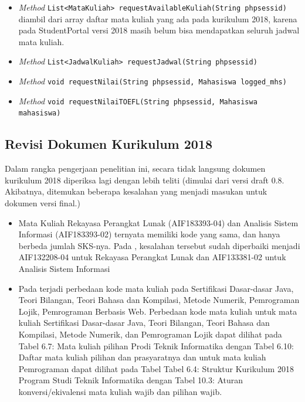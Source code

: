\begin{itemize}
\begin{itemize}
\begin{itemize}
			\item \textit{Method} \texttt{List<MataKuliah> requestAvailableKuliah(String phpsessid)} diambil dari array daftar mata kuliah yang ada pada kurikulum 2018, karena pada StudentPortal versi 2018 masih belum bisa mendapatkan seluruh jadwal mata kuliah. 
			\item \textit{Method} \texttt{List<JadwalKuliah> requestJadwal(String phpsessid)}
			\item \textit{Method} \texttt{void requestNilai(String phpsessid, Mahasiswa logged\_mhs)}
			\item \textit{Method} \texttt{void requestNilaiTOEFL(String phpsessid, Mahasiswa mahasiswa)}
		\end{itemize}
	\end{itemize}
\end{itemize}

\subsection{Revisi Dokumen Kurikulum 2018}
\label{subbab:revisidokumenkurikulum2018}

Dalam rangka pengerjaan penelitian ini, secara tidak langsung dokumen kurikulum 2018 diperiksa lagi dengan lebih teliti (dimulai dari versi draft 0.8. Akibatnya, ditemukan beberapa kesalahan yang menjadi masukan untuk dokumen versi final.)
\begin{itemize}
	\item Mata Kuliah Rekayasa Perangkat Lunak (AIF183393-04) dan Analisis Sistem Informasi (AIF183393-02) ternyata memiliki kode yang sama, dan hanya berbeda jumlah SKS-nya. Pada \cite{dokumenkurikulum2018}, kesalahan tersebut sudah diperbaiki menjadi AIF132208-04 untuk Rekayasa Perangkat Lunak dan AIF133381-02 untuk Analisis Sistem Informasi
	\item Pada \cite{dokumenkurikulum2018} terjadi perbedaan kode mata kuliah pada Sertifikasi Dasar-dasar Java, Teori Bilangan, Teori Bahasa dan Kompilasi, Metode Numerik, Pemrograman Lojik, Pemrograman Berbasis Web. Perbedaan kode mata kuliah untuk mata kuliah Sertifikasi Dasar-dasar Java, Teori Bilangan, Teori Bahasa dan Kompilasi, Metode Numerik, dan Pemrograman Lojik dapat dilihat pada \cite{dokumenkurikulum2018} Tabel 6.7: Mata kuliah pilihan Prodi Teknik Informatika dengan Tabel 6.10: Daftar mata kuliah pilihan dan prasyaratnya dan untuk mata kuliah Pemrograman dapat dilihat pada \cite{dokumenkurikulum2018} Tabel Tabel 6.4: Struktur Kurikulum 2018 Program Studi Teknik Informatika dengan Tabel 10.3: Aturan konversi/ekivalensi mata kuliah wajib dan pilihan wajib. 
\end{itemize}

